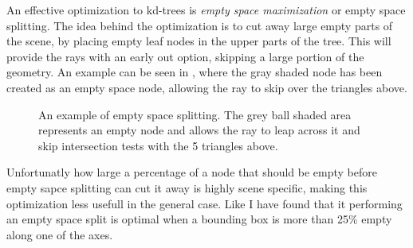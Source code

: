 An effective optimization to kd-trees is \textit{empty space
  maximization} or empty space splitting. The idea behind the
optimization is to cut away large empty parts of the scene, by placing
empty leaf nodes in the upper parts of the tree. This will provide the
rays with an early out option, skipping a large portion of the
geometry. An example can be seen in ,
where the gray shaded node has been created as an empty space node,
allowing the ray to skip over the triangles above.

\begin{figure}
  \centering
  \caption[Empty Space Splitting.]{An example of empty space
    splitting. The grey ball shaded area represents an empty node and
    allows the ray to leap across it and skip intersection tests with
    the 5 triangles above.}
  \label{fig:emptySpaceExample}
\end{figure}


Unfortunatly how large a percentage of a node that should be empty
before empty sapce splitting can cut it away is highly scene specific,
making this optimization less usefull in the general case. Like \zhou{}
I have found that it performing an empty space split is optimal when a
bounding box is more than 25\% empty along one of the axes.




